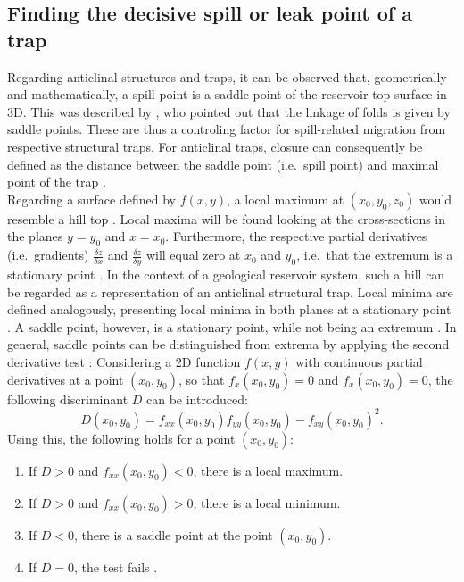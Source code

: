 			\subsection{Finding the decisive spill or leak point of a trap} %
			Regarding anticlinal structures and traps, it can be observed that, geometrically and mathematically, a spill point is a saddle point of the reservoir top surface in 3D. This was described by \citet{collignon2015fold_linkage}, who pointed out that the linkage of folds is given by saddle points. These are thus a controling factor for spill-related migration from respective structural traps. For anticlinal traps, closure can consequently be defined as the distance between the saddle point (i.e.\ spill point) and maximal point of the trap \citep{collignon2015fold_linkage}.\\
			Regarding a surface defined by $f(x,y)$, a local maximum at $(x_0,y_0,z_0)$ would resemble a hill top \citep{guichard2013calculus}. Local maxima will be found looking at the cross-sections in the planes $y = y_0$ and $x = x_0$. Furthermore, the respective partial derivatives (i.e.\ gradients) $\frac{\delta z}{\delta x}$ and $\frac{\delta z}{\delta y}$ will equal zero at $x_0$ and $y_0$, i.e.\ that the extremum is a stationary point \citep{guichard2013calculus, weisstein2017saddlepoint}. In the context of a geological reservoir system, such a hill can be regarded as a representation of an anticlinal structural trap. Local minima are defined analogously, presenting local minima in both planes at a stationary point \citep{guichard2013calculus}. A saddle point, however, is a stationary point, while not being an extremum \citep{weisstein2017saddlepoint}. In general, saddle points can be distinguished from extrema by applying the second derivative test \citep{guichard2013calculus, weisstein2017saddlepoint}: Considering a 2D function $f(x,y)$ with continuous partial derivatives at a  point $(x_0,y_0)$, so that $f_x(x_0,y_0) = 0$ and $f_x(x_0,y_0) = 0$, the following discriminant $D$ can be introduced:
			\begin{equation}\label{eq:discriminant_D}
			D(x_0,y_0) = f_{xx}(x_0,y_0)f_{yy}(x_0,y_0) - f_{xy}(x_0,y_0)^2.
			\end{equation}
			Using this, the following holds for a point $(x_0,y_0)$:
			\begin{enumerate}
				\item If $D > 0$ and $f_{xx}(x_0,y_0) < 0$, there is a local maximum.
				\item If $D > 0$ and $f_{xx}(x_0,y_0) > 0$, there is a local minimum.
				\item If $D < 0$, there is a saddle point at the point $(x_0,y_0)$.
				\item If $D = 0$, the test fails \citep{guichard2013calculus}.
			\end{enumerate}
